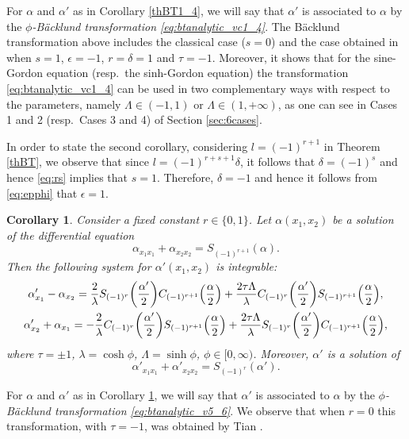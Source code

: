 \documentclass[pdftex]{sigma}
\numberwithin{equation}{section}
\newtheorem{Corollary}[Theorem]{Corollary}
\begin{document}
For $\alpha$ and $\alpha'$ as in Corollary \ref{thBT1_4}, we will say that $\alpha'$ is associated to $\alpha$ by the {\it $\phi$-B\"acklund transformation \eqref{eq:btanalytic_vc1_4}}.
 The B\"acklund transformation above includes the classical case ($s=0$) and the case obtained in \cite{McNertney1980} when $s=1$, $\epsilon=-1$, $r=\delta=1$ and $\tau=-1$.
 Moreover, it shows that for the sine-Gordon equation (resp.\ the sinh-Gordon equation)
 the transformation \eqref{eq:btanalytic_vc1_4}
 can be used in two complementary ways with respect to the parameters, namely
 $\Lambda \in (-1,1)$ or $\Lambda\in(1,+\infty)$, as one can see in Cases 1 and 2 (resp.\ Cases 3 and 4) of Section \ref{sec:6cases}.

In order to state the second corollary, considering $l=(-1)^{r+1}$ in Theorem \ref{thBT}, we observe that since $l=(-1)^{r+s+1}\delta$, it follows that $\delta=(-1)^s$ and hence \eqref{eq:rs} implies that $s=1$. Therefore, $\delta=-1$ and hence it follows from \eqref{eq:epphi} that $\epsilon=1$.

 \begin{Corollary}\label{thBT5_6}
Consider a fixed constant $r\in \{0,1\}$.
Let $\alpha(x_1,x_2)$ be a solution of
the differential equation
\begin{equation}\label{eqorig5_6}
\alpha_{x_1x_1}+\alpha_{x_2x_2} = S_{(-1)^{r+1}}(\alpha).
\end{equation}
Then the following system for $\alpha'(x_1,x_2)$ is integrable:
\begin{gather}
\alpha'_{x_1}-\alpha_{x_2}=\frac{2}{\lambda}S_{(-1)^r}\biggl(\frac{\alpha'}{2}\biggr)C_{(-1)^{r+1}}\Bigl(\frac{\alpha}{2}\Bigr)+\frac{2\tau\Lambda}{\lambda} C_{(-1)^r}\biggl(\frac{\alpha'}{2}\biggr)S_{(-1)^{r+1}}\Bigl(\frac{\alpha}{2}\Bigr),\nonumber\\
\alpha'_{x_2}+\alpha_{x_1}=-\frac{2}{\lambda}C_{(-1)^r}\biggl(\frac{\alpha'}{2}\biggr)S_{(-1)^{r+1}}\Bigl(\frac{\alpha}{2}\Bigr)+\frac{2\tau\Lambda}{\lambda} S_{(-1)^r}\biggl(\frac{\alpha'}{2}\biggr)C_{(-1)^{r+1}}\Bigl(\frac{\alpha}{2}\Bigr),\label{eq:btanalytic_v5_6}
\end{gather}
 where $\tau=\pm 1$, $\lambda=\cosh\phi$, $\Lambda=\sinh \phi$, $\phi\in [0,\infty)$.
Moreover, $\alpha'$ is a solution of
\begin{equation}\label{eqprime5_6}
\alpha'_{x_1x_1}+\alpha'_{x_2x_2} = S_{(-1)^r}(\alpha').
\end{equation}
\end{Corollary}

For $\alpha$ and $\alpha'$ as in Corollary \ref{thBT5_6}, we will say that $\alpha'$ is associated to $\alpha$ by the {\it $\phi$-B\"acklund transformation \eqref{eq:btanalytic_v5_6}}. We observe that when $r=0$
 this transformation, with $\tau=-1$, was
obtained by Tian \cite{Tian1997}.
\end{document}
